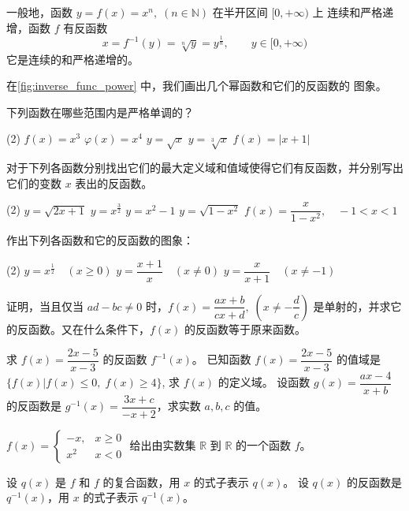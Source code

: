 一般地，函数 $y=f(x)=x^n,\; (n\in\mathbb{N})$ 在半开区间 $[0,+\infty)$ 上
连续和严格递增，函数 $f$ 有反函数
\[x=f^{-1}(y)=\sqrt[n]{y}=y^{\tfrac{1}{n}},\qquad y\in [0,+\infty)\]
它是连续的和严格递增的。

在\cref{fig:inverse_func_power} 中，我们画出几个幂函数和它们的反函数的
图象。

\begin{Exercise}
\begin{question}[itemsep=20pt]
  \item 下列函数在哪些范围内是严格单调的？
  \begin{tasks}(2)
    \task $f(x)=x^3$
    \task $\varphi(x)=x^4$
    \task $y=\sqrt{x}$
    \task $y=\sqrt[3]{x}$
    \task $f(x)=|x+1|$
  \end{tasks}  
  \item 对于下列各函数分别找出它们的最大定义域和值域使得它们有反函数，并分别写出它们的变数 $x$ 表出的反函数。
  \begin{tasks}(2)
    \task $y=\sqrt{2x+1}$
    \task $y=x^{\tfrac{3}{2}}$
    \task $y=x^2-1$
    \task $y=\sqrt{1-x^2}$
    \task $f(x)=\dfrac{x}{1-x^2},\quad -1<x<1$
  \end{tasks}  
  \item 作出下列各函数和它的反函数的图象：
  \begin{tasks}(2)
    \task $y=x^{\tfrac{1}{2}}\quad (x\geqslant 0)$
    \task $y=\dfrac{x+1}{x}\quad (x\ne 0)$
    \task $y=\dfrac{x}{x+1}\quad (x\ne -1)$
  \end{tasks}  
  \item 证明，当且仅当 $ad-bc\ne 0$ 时，$f(x)=\dfrac{ax+b}{cx+d},\; \left(x\ne -\dfrac{d}{c}\right)$ 是单射的，并求它的反函数。又在什么条件下，$f(x)$ 的反函数等于原来函数。
  \item 
  \begin{tasks}
    \task 求 $f(x)=\dfrac{2x-5}{x-3}$ 的反函数 $f^{-1}(x)$。
    \task 已知函数 $f(x)=\dfrac{2x-5}{x-3}$ 的值域是 $\{f(x)|f(x)\leqslant 0,\; f(x)\geqslant 4\}$, 求 $f(x)$ 的定义域。
    \task 设函数 $g(x)=\dfrac{ax-4}{x+b}$ 的反函数是 $g^{-1}(x)=\dfrac{3x+c}{-x+2}$，求实数 $a,b,c$ 的值。
  \end{tasks}
  \item $f(x)=\begin{cases} -x,& x\geqslant 0\\ x^2& x<0 \end{cases}$ 给出由实数集 $\mathbb{R}$ 到 $\mathbb{R}$ 的一个函数 $f$。
  \begin{tasks}
      \task 设 $q(x)$ 是 $f$ 和 $f$ 的复合函数，用 $x$ 的式子表示 $q(x)$。
      \task 设 $q(x)$ 的反函数是 $q^{-1}(x)$，用 $x$ 的式子表示 $q^{-1}(x)$。
  \end{tasks}
\end{question}
\end{Exercise}
